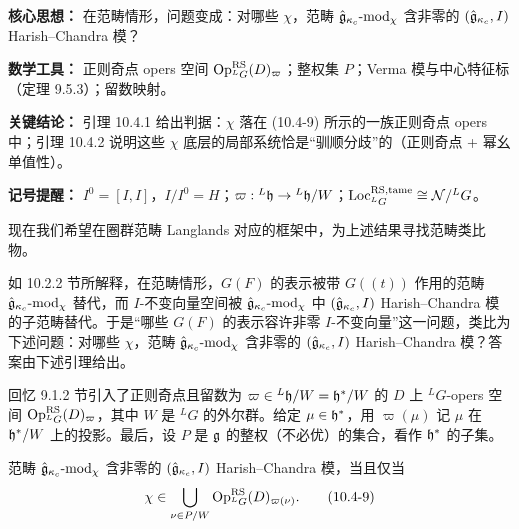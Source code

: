 \begin{keypoints}
    \item \textbf{核心思想：} 在范畴情形，问题变成：对哪些 $\chi$，范畴 $\hat{\mathfrak{g}}_{\kappa_c}\text{-}\mathrm{mod}_\chi$ 含非零的 $(\hat{\mathfrak{g}}_{\kappa_c},I)$ Harish--Chandra 模？
    \item \textbf{数学工具：} 正则奇点 opers 空间 $\operatorname{Op}^{\mathrm{RS}}_{{}^L G}(D)_{\varpi}$；整权集 $P$；Verma 模与中心特征标（定理 9.5.3）；留数映射。
    \item \textbf{关键结论：} 引理 10.4.1 给出判据：$\chi$ 落在 (10.4-9) 所示的一族正则奇点 opers 中；引理 10.4.2 说明这些 $\chi$ 底层的局部系统恰是“驯顺分歧”的（正则奇点 + 幂幺单值性）。
    \item \textbf{记号提醒：} $I^0=[I,I]$，$I/I^0=H$；$\varpi:{}^L\mathfrak{h}\to{}^L\mathfrak{h}/W$；$\operatorname{Loc}^{\mathrm{RS,tame}}_{{}^L G}\cong\mathcal{N}/{}^L G$。
\end{keypoints}

现在我们希望在圈群范畴 Langlands 对应的框架中，为上述结果寻找范畴类比物。

如 10.2.2 节所解释，在范畴情形，$G(F)$ 的表示被带 $G((t))$ 作用的范畴 $\hat{\mathfrak{g}}_{\kappa_c}\text{-}\mathrm{mod}_\chi$ 替代，而 $I$-不变向量空间被 $\hat{\mathfrak{g}}_{\kappa_c}\text{-}\mathrm{mod}_\chi$ 中 $(\hat{\mathfrak{g}}_{\kappa_c},I)$ Harish--Chandra 模的子范畴替代。于是“哪些 $G(F)$ 的表示容许非零 $I$-不变向量”这一问题，类比为下述问题：对哪些 $\chi$，范畴 $\hat{\mathfrak{g}}_{\kappa_c}\text{-}\mathrm{mod}_\chi$ 含非零的 $(\hat{\mathfrak{g}}_{\kappa_c},I)$ Harish--Chandra 模？答案由下述引理给出。

回忆 9.1.2 节引入了正则奇点且留数为 $\varpi\in{}^L\mathfrak{h}/W=\mathfrak{h}^*/W$ 的 $D$ 上 ${}^L G$-opers 空间 $\operatorname{Op}^{\mathrm{RS}}_{{}^L G}(D)_{\varpi}$，其中 $W$ 是 ${}^L G$ 的外尔群。给定 $\mu\in\mathfrak{h}^*$，用 $\varpi(\mu)$ 记 $\mu$ 在 $\mathfrak{h}^*/W$ 上的投影。最后，设 $P$ 是 $\mathfrak{g}$ 的整权（不必优）的集合，看作 $\mathfrak{h}^*$ 的子集。

\begin{lemma}\label{lem:u16-tame-crit}
    范畴 $\hat{\mathfrak{g}}_{\kappa_c}\text{-}\mathrm{mod}_\chi$ 含非零的 $(\hat{\mathfrak{g}}_{\kappa_c},I)$ Harish--Chandra 模，当且仅当
    \begin{equation}
        \chi\in\bigcup_{\nu\in P/W}\operatorname{Op}^{\mathrm{RS}}_{{}^L G}(D)_{\varpi(\nu)}.
        \tag{10.4-9}
    \end{equation}
\end{lemma}

